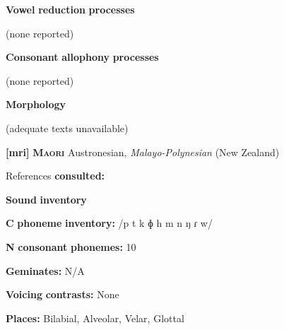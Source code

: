 \begin{styleBody}
\textbf{Vowel} \textbf{reduction} \textbf{processes}
\end{styleBody}

\begin{styleBody}
(none reported)
\end{styleBody}

\begin{styleBody}
\textbf{Consonant} \textbf{allophony} \textbf{processes}
\end{styleBody}

\begin{styleBody}
(none reported)
\end{styleBody}

\begin{styleBody}
\textbf{Morphology}
\end{styleBody}

\begin{styleBody}
(adequate texts unavailable)
\end{styleBody}

\begin{styleBody}
\textbf{[mri]}   \textbf{\textsc{Maori}}  Austronesian, \textit{Malayo-Polynesian} (New Zealand)
\end{styleBody}

\begin{styleBody}
References \textbf{consulted:} \citet{Bauer1999}
\end{styleBody}

\begin{styleBody}
\textbf{Sound} \textbf{inventory}
\end{styleBody}

\begin{styleBody}
\textbf{C} \textbf{phoneme} \textbf{inventory:} /p t k ɸ h m n ŋ ɾ w/
\end{styleBody}

\begin{styleBody}
\textbf{N} \textbf{consonant} \textbf{phonemes:} 10
\end{styleBody}

\begin{styleBody}
\textbf{Geminates:} N/A
\end{styleBody}

\begin{styleBody}
\textbf{Voicing} \textbf{contrasts:} None
\end{styleBody}

\begin{styleBody}
\textbf{Places:} Bilabial, Alveolar, Velar, Glottal
\end{styleBody}

